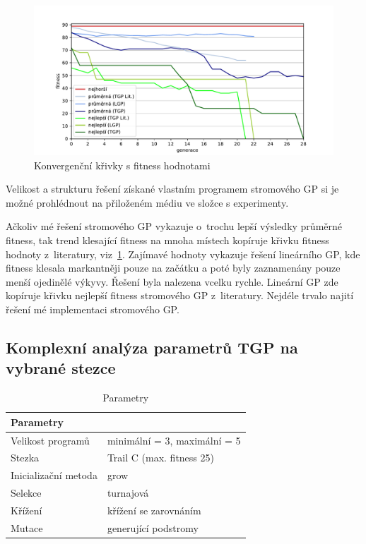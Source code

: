 \newpage
\begin{figure}[!h]
    \centering
    \includegraphics[scale=0.68]{obrazky-figures/lit-corv-curves.pdf}
    \caption{Konvergenční křivky s fitness hodnotami}
    \label{lit-corv-curves}
\end{figure}

Velikost a strukturu řešení získané vlastním programem stromového GP si je možné prohlédnout na přiloženém médiu ve složce s experimenty. 

Ačkoliv mé řešení stromového GP vykazuje o~trochu lepší výsledky průměrné fitness, tak trend klesající fitness na mnoha místech kopíruje křivku fitness hodnoty z~literatury, viz~\ref{lit-corv-curves}. Zajímavé hodnoty vykazuje řešení lineárního GP, kde fitness klesala markantněji pouze na začátku a poté byly zaznamenány pouze menší ojedinělé výkyvy. Řešení byla nalezena vcelku rychle. Lineární GP zde kopíruje křivku nejlepší fitness stromového GP z~literatury. Nejdéle trvalo najití řešení mé implementaci stromového GP. 

\clearpage
\subsection{Komplexní analýza parametrů TGP na vybrané stezce} 

\begin{table}[h!]
\centering
\begin{tabular}{ll}
\hline
\textbf{Parametry}  &                               \\ \hline
Velikost programů   & minimální = 3, maximální = 5 \\
Stezka              & Trail C (max. fitness 25)                     \\
Inicializační metoda & grow                          \\
Selekce             & turnajová                    \\
Křížení             & křížení se zarovnáním         \\
Mutace              & generující podstromy          \\ \hline
\end{tabular}
\caption{Parametry}
\label{tab:6.3.10}
\end{table}

